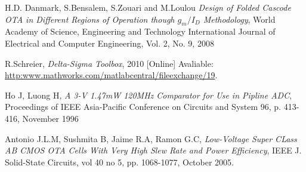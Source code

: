 \begin{thebibliography}{9}
H.D. Danmark, S.Bensalem, S.Zouari and M.Loulou
\textit{Design of Folded Cascode OTA in Different Regions of Operation though $g_m/I_D$ Methodology},
World Academy of Science, Engineering and Technology International Journal of Electrical and Computer Engineering, Vol. 2, No. 9, 2008

R.Schreier,
\textit{Delta-Sigma Toolbox},
2010
[Online]
Avaliable:
\url{http:www.mathworks.com/matlabcentral/fileexchange/19}.

Ho J, Luong H,
\textit{A 3-V 1.47mW 120MHz Comparator for Use in Pipline ADC},
Proceedings of IEEE Asia-Pacific Conference on Circuits and System 96, p. 413-416, November 1996

Antonio J.L.M, Sushmita B, Jaime R.A, Ramon G.C,
\textit{Low-Voltage Super CLass AB CMOS OTA Cells With Very High Slew Rate and Power Efficiency},
IEEE J. Solid-State Circuits, vol 40 no 5, pp. 1068-1077, October 2005.
\end{thebibliography}

